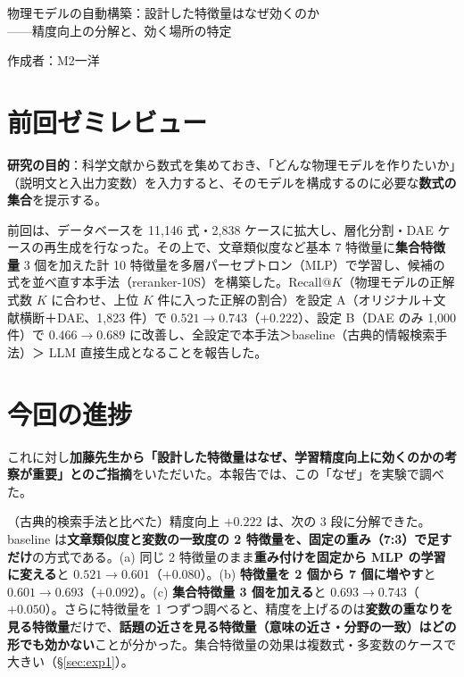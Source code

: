 \documentclass[a4j,dvipdfmx,11pt]{jresume}
\makeatletter
\newcommand{\rk}{\textrm{Recall@}K}
\makeatother
\begin{document}

\medskip
\begin{center}
  {\Large 物理モデルの自動構築：設計した特徴量はなぜ効くのか\\
  ——精度向上の分解と、効く場所の特定}
\end{center}

\begin{flushright}
作成者：M2\quad 一洋
\end{flushright}
\medskip

\section{前回ゼミレビュー}
\textbf{研究の目的}：科学文献から数式を集めておき、「どんな物理モデルを作りたいか」（説明文と入出力変数）を入力すると、そのモデルを構成するのに必要な\textbf{数式の集合}を提示する。

前回は、データベースを 11{,}146 式・2{,}838 ケースに拡大し、層化分割・DAE ケースの再生成を行なった。その上で、文章類似度など基本 7 特徴量に\textbf{集合特徴量} 3 個を加えた計 10 特徴量を多層パーセプトロン（MLP）で学習し、候補の式を並べ直す本手法（reranker-10S）を構築した。$\rk$（物理モデルの正解式数 $K$ に合わせ、上位 $K$ 件に入った正解の割合）を設定 A（オリジナル＋文献横断＋DAE、1{,}823 件）で $0.521\to0.743$（$+0.222$）、設定 B（DAE のみ 1{,}000 件）で $0.466\to0.689$ に改善し、全設定で本手法＞baseline（古典的情報検索手法）＞ LLM 直接生成となることを報告した。

\section{今回の進捗}
これに対し\textbf{加藤先生から「設計した特徴量はなぜ、学習精度向上に効くのかの考察が重要」とのご指摘}をいただいた。本報告では、この「なぜ」を実験で調べた。

（古典的検索手法と比べた）精度向上 $+0.222$ は、次の 3 段に分解できた。baseline は\textbf{文章類似度と変数の一致度の 2 特徴量を、固定の重み（7:3）で足すだけ}の方式である。(a) 同じ 2 特徴量のまま\textbf{重み付けを固定から MLP の学習に変える}と $0.521\to0.601$（$+0.080$）。(b) \textbf{特徴量を 2 個から 7 個に増やす}と $0.601\to0.693$（$+0.092$）。(c) \textbf{集合特徴量 3 個を加える}と $0.693\to0.743$（$+0.050$）。さらに特徴量を 1 つずつ調べると、精度を上げるのは\textbf{変数の重なりを見る特徴量}だけで、\textbf{話題の近さを見る特徴量（意味の近さ・分野の一致）はどの形でも効かない}ことが分かった。集合特徴量の効果は複数式・多変数のケースで大きい（\S\ref{sec:exp1}）。
\end{document}
